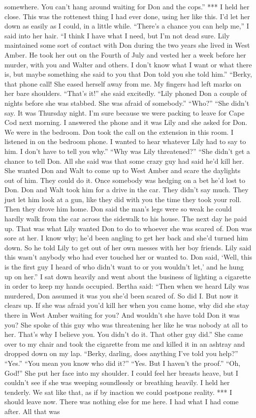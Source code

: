 \documentclass{novel}
\begin{document}
somewhere. You can’t hang around waiting for Don and the cops.” *** I held her close. This was the rottenest thing I had ever done, using her like this. I’d let her down as easily as I could, in a little while. “There’s a chance you can help me,” I said into her hair. “I think I have what I need, but I’m not dead sure. Lily maintained some sort of contact with Don during the two years she lived in West Amber. He took her out on the Fourth of July and vested her a week before her murder, with you and Walter and others. I don’t know what I want or what there is, but maybe something she said to you that Don told you she told him.” “Berky, that phone call! She eased herself away from me. My fingers had left marks on her bare shoulders. “That’s it!” she said excitedly. “Lily phoned Don a couple of nights before she was stabbed. She was afraid of somebody.” “Who?” “She didn’t say. It was Thursday night. I’m sure because we were packing to leave for Cape Cod next morning. I answered the phone and it was Lily and she asked for Don. We were in the bedroom. Don took the call on the extension in this room. I listened in on the bedroom phone. I wanted to hear whatever Lily had to say to him. I don’t have to tell you why.” “Why was Lily threatened?” “She didn’t get a chance to tell Don. All she said was that some crazy guy had said he’d kill her. She wanted Don and Walt to come up to West Amber and scare the daylights out of him. They could do it. Once somebody was hedging on a bet he’d lost to Don. Don and Walt took him for a drive in the car. They didn’t say much. They just let him look at a gun, like they did with you the time they took your roll. Then they drove him home. Don said the man’s legs were so weak he could hardly walk from the car across the sidewalk to his house. The next day he paid up. That was what Lily wanted Don to do to whoever she was scared of. Don was sore at her. I know why; he’d been angling to get her back and she’d turned him down. So he told Lily to get out of her own messes with her boy friends. Lily said this wasn’t anybody who had ever touched her or wanted to. Don said, ‘Well, this is the first guy I heard of who didn’t want to or you wouldn’t let,’ and he hung up on her.” I sat down heavily and went about the business of lighting a cigarette in order to keep my hands occupied. Bertha said: “Then when we heard Lily was murdered, Don assumed it was you she’d been scared of. So did I. But now it clears up. If she was afraid you’d kill her when you came home, why did she stay there in West Amber waiting for you? And wouldn’t she have told Don it was you? She spoke of this guy who was threatening her like he was nobody at all to her. That’s why I believe you. You didn’t do it. That other guy did.” She came over to my chair and took the cigarette from me and killed it in an ashtray and dropped down on my lap. “Berky, darling, does anything I’ve told you help?” “Yes.” “You mean you know who did it?” “Yes. But I haven’t the proof.” “Oh, God!” She put her face into my shoulder. I could feel her breasts heave, but I couldn’t see if she was weeping soundlessly or breathing heavily. I held her tenderly. We sat like that, as if by inaction we could postpone reality. *** I should leave now. There was nothing else for me here. I had what I had come after. All that was 
\end{document}
